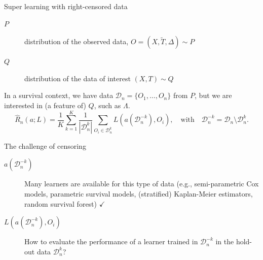 \documentclass[smaller]{beamer}\usepackage{listings}
\begin{document}
\begin{frame}[label={sec:org15dd7f4}]{Super learning with right-censored data}
\small

\begin{description}
\item[{\(P\)}] distribution of the observed data, \(O = (X, \tilde T, \Delta)
  \sim P\)
\item[{\(Q\)}] distribution of the data of interest \((X, T) \sim Q\)
\end{description}

\hfill

In a survival context, we have data \(\mathcal{D}_n = \{O_1, \dots, O_n\}\)
from \(P\), but we are interested in (a feature of) \(Q\), such as
\(\Lambda\).
\begin{equation*}
  \hat{R}_n(a; L) =
  \frac{1}{K}\sum_{k=1}^{K}
  \frac{1}{| \mathcal{D}_n^{k} |}\sum_{O_i \in \mathcal{D}_n^{k}}
  L
  {
    \left(
      a{ (\mathcal{D}_n^{-k})}
      , O_i
    \right)
  },
  \quad \text{with} \quad
  \mathcal{D}_n^{-k} = \mathcal{D}_n \setminus \mathcal{D}_n^{k}.
\end{equation*}

\pause

\begin{block}{The challenge of censoring}
\begin{description}
\item[{\(a{ (\mathcal{D}_n^{-k})}\)}] Many learners are available for this type of
data (e.g., semi-parametric Cox models, parametric survival models,
(stratified) Kaplan-Meier estimators, random survival forest) \(\checkmark\)
\item[{\(L(a{ (\mathcal{D}_n^{-k})} , O_i)\)}] How to evaluate the performance of
a learner trained in \(\mathcal{D}_n^{-k}\) in the hold-out data \(\mathcal{D}_n^{k}\)?
\end{description}
\end{block}
\end{frame}
\end{document}
